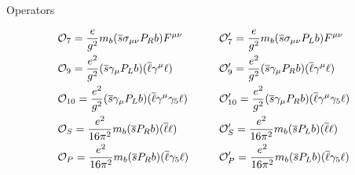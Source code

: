 \documentclass[aspectratio=1610]{beamer}
\begin{document}
\begin{frame}{Operators}

\begin{alignat*}{2}
&{\mathcal{O}}_{7} = \frac{e}{g^{2}}m_{{b}}({\overline {{s}}}\sigma_{\mu\nu}P_{R}{b})F^{\mu\nu}~~~~~~~&&{\mathcal{O}}_{7}^{\prime} = \frac{e}{g^{2}}m_{{b}}({\overline {{s}}}\sigma_{\mu\nu}P_{L}{b})F^{\mu\nu} \nonumber \\
&{\mathcal{O}}_{9} = \frac{e^{2}}{g^{2}}({\overline {{s}}}\gamma_{\mu}P_{L}{b})({\overline \ell}\gamma^{\mu}\ell) &&{\mathcal{O}}_{9}^{\prime} = \frac{e^{2}}{g^{2}}({\overline {{s}}}\gamma_{\mu}P_{R}{b})({\overline \ell}\gamma^{\mu}\ell) \nonumber \\
&{\mathcal{O}}_{10} = \frac{e^{2}}{g^{2}}({\overline {{s}}}\gamma_{\mu}P_{L}{b})({\overline \ell}\gamma^{\mu}\gamma_{5}\ell) &&{\mathcal{O}}_{10}^{\prime} = \frac{e^{2}}{g^{2}}({\overline {{s}}}\gamma_{\mu}P_{R}{b})({\overline \ell}\gamma^{\mu}\gamma_{5}\ell) \\
&{\mathcal{O}}_{S} = \frac{e^{2}}{16\pi^{2}}m_{{b}}({\overline {{s}}} P_{R}{b})({\overline \ell}\ell) &&{\mathcal{O}}_{S}^{\prime} = \frac{e^{2}}{16\pi^{2}}m_{{b}}({\overline {{s}}} P_{L}{b})({\overline \ell}\ell) \nonumber\\
&{\mathcal{O}}_{P} = \frac{e^{2}}{16\pi^{2}}m_{{b}}({\overline {{s}}} P_{R}{b})({\overline \ell}\gamma_{5}\ell) &&{\mathcal{O}}_{P}^{\prime} = \frac{e^{2}}{16\pi^{2}}m_{{b}}({\overline {{s}}} P_{L}{b})({\overline \ell}\gamma_{5}\ell) \nonumber
\end{alignat*}

\end{frame}
\end{document}
